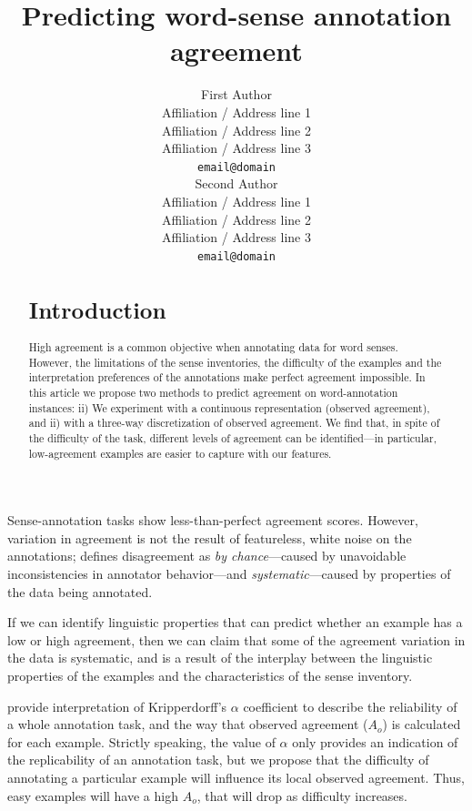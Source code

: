 \documentclass[11pt,a4paper]{article}
\title{Predicting word-sense annotation agreement}
\author{First Author \\
  Affiliation / Address line 1 \\
  Affiliation / Address line 2 \\
  Affiliation / Address line 3 \\
  {\tt email@domain} \\\And
  Second Author \\
  Affiliation / Address line 1 \\
  Affiliation / Address line 2 \\
  Affiliation / Address line 3 \\
  {\tt email@domain} \\}
\date{}
\begin{document}
\maketitle
\begin{abstract}
\section{Introduction}


High agreement is a common objective when annotating data for word senses.  However, the limitations of the sense inventories, the difficulty of the examples and the interpretation preferences of the annotations make perfect agreement impossible.
In this article we propose two methods to predict agreement on word-annotation instances: ii) We experiment with a continuous representation (observed agreement), and ii) with a three-way discretization of observed agreement. We find that, in spite of the difficulty of the task, different levels of agreement can be identified---in particular, low-agreement examples are easier to capture with our features.
\end{abstract}

Sense-annotation tasks show less-than-perfect agreement scores. However, variation in agreement is not the result of featureless, white noise on the annotations;  defines disagreement as \textit{by chance}---caused by unavoidable inconsistencies in annotator behavior---and \textit{systematic}---caused by properties of the data being annotated.

If we can identify linguistic properties that can predict whether an example has a low or high agreement, then we can claim that some of the agreement variation in the data is systematic, and is a result of the interplay between the linguistic properties of the examples and the characteristics of the sense inventory.



 provide interpretation of Kripperdorff's $\alpha$ coefficient to describe the reliability of a whole annotation task, and the way that observed agreement ($A_o$) is calculated for each example. Strictly speaking, the value of $\alpha$ only provides an indication of the replicability of an annotation task, but we propose that the difficulty of annotating a particular example will influence its local observed agreement. Thus, easy examples will have a high $A_o$, that will drop as difficulty increases. 


\end{document}
